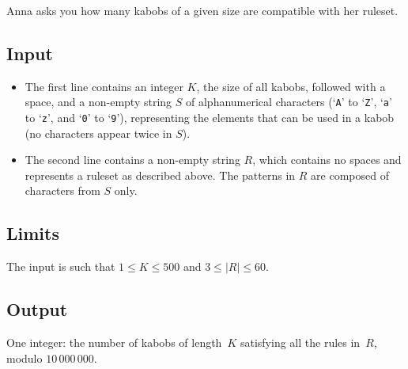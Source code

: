 Anna asks you how many kabobs of a given size are compatible with her ruleset.

\subsection*{Input}

\begin{itemize}
\item The first line contains an integer $K$, the size of all kabobs,
  followed with a space, and a
  non-empty string $S$ of alphanumerical characters (`\texttt{A}' to `\texttt{Z}',
    `\texttt{a}' to `\texttt{z}', and `\texttt{0}' to `\texttt{9}'),
  representing the elements that can be used in a kabob (no
  characters appear twice in $S$).
\item The second line contains a non-empty string $R$, which contains no spaces and represents
  a ruleset as described above. The patterns in $R$ are composed of characters from $S$ only.
\end{itemize}

\subsection*{Limits}

The input is such that $1 \leq K \leq 500$ and $3\leq |R| \leq 60$.

\subsection*{Output}

One integer: the number of kabobs of length~$K$ satisfying all
the rules in~$R$, modulo $10\,000\,000$.


